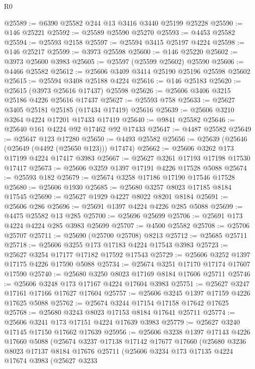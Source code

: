 \begin{lexlean}{R0}
\begin{coremodule}
@25589 := @6390 @25582 @244 @13 @3416 @3440 @25199 @25228
@25590 := @146 @25221
@25592 := @25589 @25590 @25270
@25593 := @4453 @25582
@25594 := @25593 @2158
@25597 := @25594 @3415 @25197 @4224
@25598 := @146 @25217
@25599 := @3973 @25598
@25600 := @146 @25220
@25602 := @3973 @25600 @3983
@25605 := @25597 (@25599 @25602) @25590
@25606 := @4466 @25582
@25612 := @25606 @3409 @3414 @25190 @25196 @25598 @25602
@25615 := @25594 @3408 @25188 @4224
@25616 := @146 @25183
@25620 := @25615 (@3973 @25616 @17437) @25598
@25626 := @25606 @3406 @3215 @25186 @4226 @25616 @17437
@25627 := @25593 @758
@25633 := @25627 @3405 @25181 @25185 (@17434 @17419) @25616
@25639 := @25606 @3210 @3264 @4224 @17201 @17433 @17419
@25640 := @9841 @25582
@25646 := @25640 @161 @4224 @92 @17462 @92 @17433
@25647 := @4487 @25582
@25649 := @25647 @123 @17280
@25650 := @4493 @25582
@25656 := @25639 (@25646 (@25649 (@4492 (@25650 @123))) @17474)
@25662 := @25606 @3262 @173 @17199 @4224 @17417 @3983
@25667 := @25627 @3261 @17193 @17198 @17530 @17417
@25673 := @25606 @3259 @1397 @17191 @4226 @17528 @5088
@25674 := @25593 @182
@25679 := @25674 @3258 @17186 @17190 @17546 @17528
@25680 := @25606 @1930
@25685 := @25680 @3257 @8023 @17185 @8184 @17545
@25690 := @25627 @1929 @4227 @8022 @8201 @8184
@25691 := @25606 @286
@25696 := @25691 @1397 @4224 @4226 @285 @5088
@25699 := @4475 @25582 @13 @285
@25700 := @25696 @25699
@25706 := @25691 @173 @4224 @4224 @285 @3983 @25699
@25707 := @4500 @25582
@25708 := @25706 @25707
@25711 := @25690 (@25700 @25708) @8213
@25712 := @25685 @25711
@25718 := @25606 @3255 @173 @17183 @4224 @17543 @3983
@25723 := @25627 @3254 @17177 @17182 @17592 @17543
@25729 := @25606 @3252 @1397 @17175 @4226 @17590 @5088
@25734 := @25674 @3251 @17170 @17174 @17607 @17590
@25740 := @25680 @3250 @8023 @17169 @8184 @17606 @25711
@25746 := @25606 @3248 @173 @17167 @4224 @17604 @3983
@25751 := @25627 @3247 @17161 @17166 @17627 @17604
@25757 := @25606 @3245 @1397 @17159 @4226 @17625 @5088
@25762 := @25674 @3244 @17154 @17158 @17642 @17625
@25768 := @25680 @3243 @8023 @17153 @8184 @17641 @25711
@25774 := @25606 @3241 @173 @17151 @4224 @17639 @3983
@25779 := @25627 @3240 @17145 @17150 @17662 @17639
@25956 := @25606
    @3238
    @1397
    @17143
    @4226
    @17660
    @5088
    (@25674
      @3237
      @17138
      @17142
      @17677
      @17660
      (@25680
        @3236
        @8023
        @17137
        @8184
        @17676
        @25711
        (@25606
          @3234
          @173
          @17135
          @4224
          @17674
          @3983
          (@25627
            @3233

\end{coremodule}
\end{lexlean}
